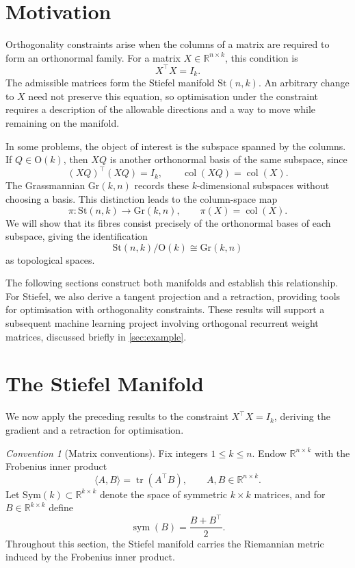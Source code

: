 \documentclass[12pt]{article}
\theoremstyle{definition}
\theoremstyle{plain}
\theoremstyle{remark}
\newtheorem{convention}[definition]{Convention}
\newcommand{\R}{\mathbb{R}}
\newcommand{\St}{\mathrm{St} (n,k)}
\newcommand{\Gr}{\mathrm{Gr} (k,n)}
\newcommand{\Orth}{\mathrm{O}}               %
\newcommand{\Sym}{\mathrm{Sym}}              %
\DeclareMathOperator{\sym}{sym}              %
\DeclareMathOperator{\tr}{tr}
\DeclareMathOperator{\col}{col}              %
\begin{document}
\section{Motivation}\label{sec:motivation}

Orthogonality constraints arise when the columns of a matrix are required to form an orthonormal family.
For a matrix \( X\in\R^{n\times k} \), this condition is
\[
  X^\top X=I_k.
\]
The admissible matrices form the Stiefel manifold \( \St \).
An arbitrary change to \( X \) need not preserve this equation, so optimisation under the constraint requires a description of the allowable directions and a way to move while remaining on the manifold.

In some problems, the object of interest is the subspace spanned by the columns.
If \( Q\in\Orth(k) \), then \( XQ \) is another orthonormal basis of the same subspace, since
\[
  (XQ)^\top(XQ)=I_k,
  \qquad
  \col(XQ)=\col(X).
\]
The Grassmannian \( \Gr \) records these \( k \)-dimensional subspaces without choosing a basis.
This distinction leads to the column-space map
\[
  \pi:\St\longrightarrow\Gr,
  \qquad
  \pi(X)=\col(X).
\]
We will show that its fibres consist precisely of the orthonormal bases of each subspace, giving the identification
\[
  \St/\Orth(k)\cong\Gr
\]
as topological spaces.

The following sections construct both manifolds and establish this relationship.
For Stiefel, we also derive a tangent projection and a retraction, providing tools for optimisation with orthogonality constraints.
These results will support a subsequent machine learning project involving orthogonal recurrent weight matrices, discussed briefly in \cref{sec:example}.
\section{The Stiefel Manifold}\label{sec:stiefel}

We now apply the preceding results to the constraint \( X^\top X=I_k \), deriving the gradient and a retraction for optimisation.


\begin{convention}[Matrix conventions]\label{conv:matrix-conventions}
  Fix integers \( 1 \le k \le n \). Endow \( \R^{n \times k} \) with the Frobenius inner product
  \[
    \langle A, B \rangle = \tr(A^\top B), \qquad A, B \in \R^{n \times k}.
  \]
  Let \( \Sym(k) \subset \R^{k \times k} \) denote the space of symmetric \( k \times k \) matrices, and for \( B \in \R^{k \times k} \) define
  \[
    \sym(B) = \frac{B + B^\top}{2}.
  \]
  Throughout this section, the Stiefel manifold carries the Riemannian metric induced by the Frobenius inner product.
\end{convention}
\end{document}
